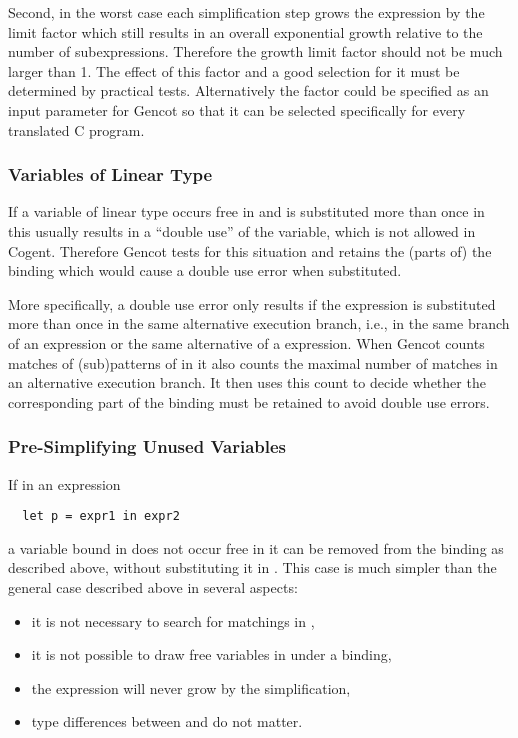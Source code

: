 Second, in the worst case each simplification step grows the expression by the limit factor which still results in an overall exponential growth
relative to the number of subexpressions. Therefore the growth limit factor should not be much larger than 1. The effect of this
factor and a good selection for it must be determined by practical tests. Alternatively the factor could be specified as an input 
parameter for Gencot so that it can be selected specifically for every translated C program.

\subsubsection{Variables of Linear Type}

If a variable of linear type occurs free in  and  is substituted more than once in  this
usually results in a ``double use'' of the variable, which is not allowed in Cogent. Therefore Gencot tests for this situation
and retains the (parts of) the binding which would cause a double use error when substituted.

More specifically, a double use error only results if the expression is substituted more than once in the same alternative
execution branch, i.e., in the same branch of an  expression or the same alternative of a  expression.
When Gencot counts matches of (sub)patterns of  in  it also counts the maximal number of matches in an
alternative execution branch. It then uses this count to decide whether the corresponding part of the binding must be retained
to avoid double use errors.

\subsubsection{Pre-Simplifying Unused Variables}

If in an expression
\begin{verbatim}
  let p = expr1 in expr2
\end{verbatim}
a variable bound in  does not occur free in  it can be removed from the binding  as described above,
without substituting it in . This case is much simpler than the general case described above in several aspects:
\begin{itemize}
\item it is not necessary to search for matchings in ,
\item it is not possible to draw free variables in  under a binding,
\item the expression will never grow by the simplification,
\item type differences between  and  do not matter.
\end{itemize}

